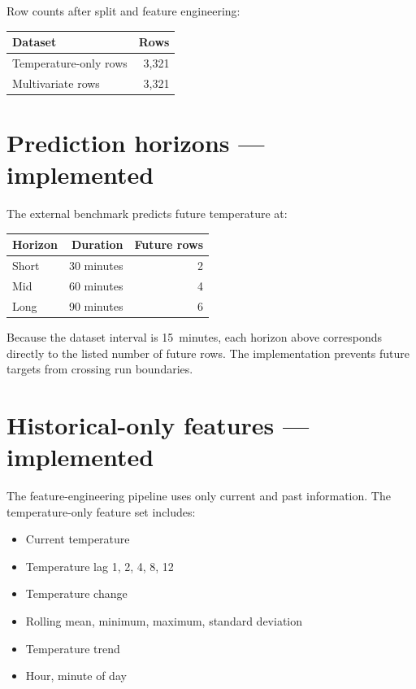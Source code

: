 \documentclass[11pt,a4paper]{article}
\begin{document}
\noindent Row counts after split and feature engineering:

\begin{center}
\begin{tabular}{lr}
\toprule
\textbf{Dataset} & \textbf{Rows} \\
\midrule
Temperature-only rows & 3{,}321 \\
Multivariate rows     & 3{,}321 \\
\bottomrule
\end{tabular}
\end{center}

\section{Prediction horizons --- implemented}

The external benchmark predicts future temperature at:

\begin{center}
\begin{tabular}{lrr}
\toprule
\textbf{Horizon} & \textbf{Duration} & \textbf{Future rows} \\
\midrule
Short  & 30 minutes & 2 \\
Mid    & 60 minutes & 4 \\
Long   & 90 minutes & 6 \\
\bottomrule
\end{tabular}
\end{center}

\noindent Because the dataset interval is 15~minutes, each horizon above
corresponds directly to the listed number of future rows. The
implementation prevents future targets from crossing run boundaries.

\section{Historical-only features --- implemented}

The feature-engineering pipeline uses only current and past information.
The temperature-only feature set includes:

\begin{itemize}[leftmargin=2em,itemsep=2pt]
  \item Current temperature
  \item Temperature lag 1, 2, 4, 8, 12
  \item Temperature change
  \item Rolling mean, minimum, maximum, standard deviation
  \item Temperature trend
  \item Hour, minute of day
\end{itemize}
\end{document}
